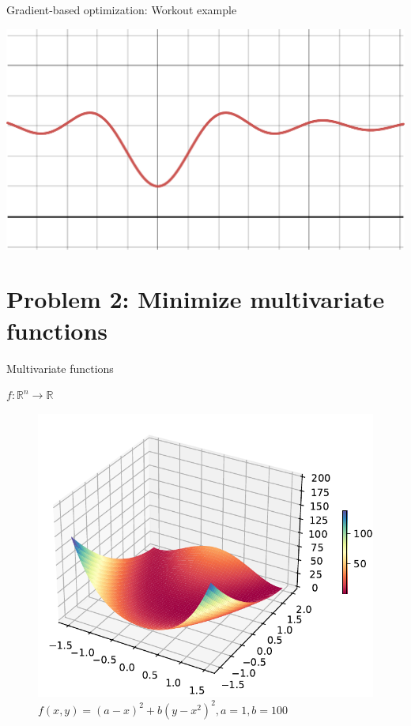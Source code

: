 \documentclass[12pt,aspectratio=169]{beamer}
\begin{document}
\begin{frame}{Gradient-based optimization: Workout example}
	
\includegraphics[width=0.99\linewidth]{img/desmos-graph1.pdf}

	
\end{frame}


\section{Problem 2: Minimize multivariate functions}


\begin{frame}{Multivariate functions}
	
$f: \mathbb{R}^n \to \mathbb{R}$

\pause

\begin{figure}
	\centering
\includegraphics[width=0.55\linewidth]{img/rosenbrock.pdf}
\caption{$f(x,y)=(a-x)^{2}+b(y-x^{2})^{2}, a = 1, b = 100$}
\end{figure}
\end{frame}
\end{document}
